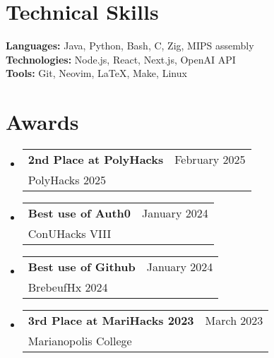 \documentclass[letterpaper,11pt]{article}
\makeatletter
\newcommand{\cvheading}[4]{
  \vspace{-2pt}\item
    \begin{tabular*}{\textwidth}[t]{l@{\extracolsep{\fill}}r}
      \large\textbf{#1} & #2 \\
      \small#3 & \small #4 \\
    \end{tabular*}\vspace{-7pt}
}
\newcommand{\cvheadingstart}{\begin{itemize}[leftmargin=0in, label={}]}
\newcommand{\cvheadingend}{\end{itemize}}
\makeatother
\begin{document}
\section{Technical Skills}
\textbf{Languages:} Java, Python, Bash, C, Zig, MIPS assembly \\
\textbf{Technologies:} Node.js, React, Next.js, OpenAI API \\
\textbf{Tools:} Git, Neovim, LaTeX, Make, Linux \\
\vspace{-5pt}

\section{Awards}
\cvheadingstart
  \cvheading
    {2nd Place at PolyHacks}{February 2025}
    {PolyHacks 2025}{}
  \cvheading
    {Best use of Auth0}{January 2024}
    {ConUHacks VIII}{}
  \cvheading
    {Best use of Github}{January 2024}
    {BrebeufHx 2024}{}
  \cvheading
    {3rd Place at MariHacks 2023}{March 2023}
    {Marianopolis College}{}
\cvheadingend
\end{document}

